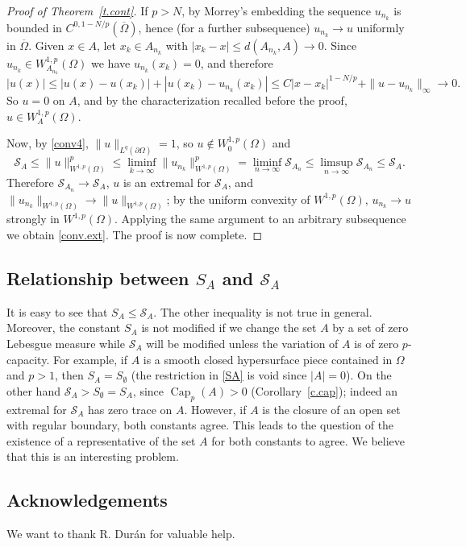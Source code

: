 \documentclass[11pt]{amsart}
\theoremstyle{remark}
\numberwithin{equation}{section}
\newcommand{\cS}{\mathcal{S}}
\DeclareMathOperator{\capa}{Cap}
\begin{document}
\begin{proof}[Proof of Theorem~\ref{t.cont}]
If $p>N$, by Morrey's embedding the sequence $u_{n_k}$ is bounded in $C^{0,1-N/p}(\overline\Omega)$, hence (for a further subsequence) $u_{n_k}\to u$ uniformly in $\overline\Omega$. Given $x\in A$, let $x_k\in A_{n_k}$ with $|x_k-x|\le d(A_{n_k},A)\to0$. Since $u_{n_k}\in W^{1,p}_{A_{n_k}}(\Omega)$ we have $u_{n_k}(x_k)=0$, and therefore
\[
|u(x)|\le|u(x)-u(x_k)|+|u(x_k)-u_{n_k}(x_k)|\le C|x-x_k|^{1-N/p}+\|u-u_{n_k}\|_\infty\to0.
\]
So $u=0$ on $A$, and by the characterization recalled before the proof, $u\in W^{1,p}_A(\Omega)$.

Now, by \eqref{conv4}, $\|u\|_{L^q(\partial\Omega)}=1$, so $u\notin W^{1,p}_0(\Omega)$ and
\[
\cS_A\le\|u\|^p_{W^{1,p}(\Omega)}\le\liminf_{k\to\infty}\|u_{n_k}\|^p_{W^{1,p}(\Omega)}=\liminf_{n\to\infty}\cS_{A_n}\le\limsup_{n\to\infty}\cS_{A_n}\le\cS_A.
\]
Therefore $\cS_{A_n}\to\cS_A$, $u$ is an extremal for $\cS_A$, and $\|u_{n_k}\|_{W^{1,p}(\Omega)}\to\|u\|_{W^{1,p}(\Omega)}$; by the uniform convexity of $W^{1,p}(\Omega)$, $u_{n_k}\to u$ strongly in $W^{1,p}(\Omega)$. Applying the same argument to an arbitrary subsequence we obtain \eqref{conv.ext}. The proof is now complete.
\end{proof}

\subsection{Relationship between $S_A$ and $\cS_A$}
It is easy to see that $S_A\le\cS_A$. The other inequality is not true in general. Moreover, the constant $S_A$ is not modified if we change the set $A$ by a set of zero Lebesgue measure while $\cS_A$ will be modified unless the variation of $A$ is of zero $p$-capacity. For example, if $A$ is a smooth closed hypersurface piece contained in $\Omega$ and $p>1$, then $S_A=S_\emptyset$ (the restriction in \eqref{SA} is void since $|A|=0$). On the other hand $\cS_A>S_\emptyset=S_A$, since $\capa_p(A)>0$ (Corollary~\ref{c.cap}); indeed an extremal for $\cS_A$ has zero trace on $A$. However, if $A$ is the closure of an open set with regular boundary, both constants agree. This leads to the question of the existence of a representative of the set $A$ for both constants to agree. We believe that this is an interesting problem.

\subsection*{Acknowledgements} We want to thank R. Durán for valuable help.
\end{document}
